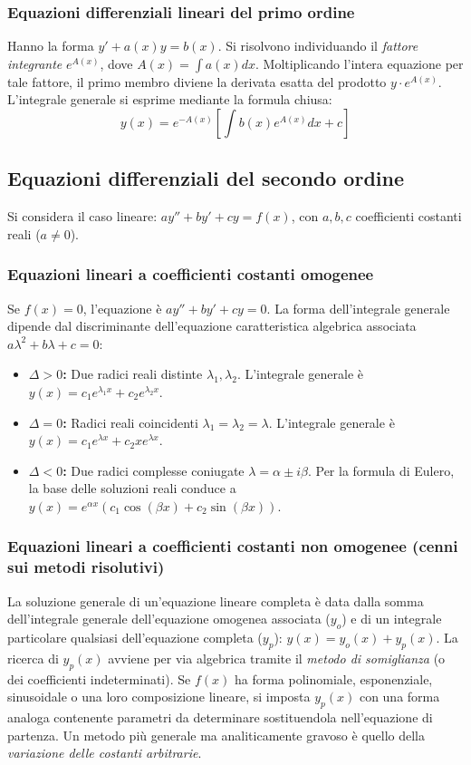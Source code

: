 \subsubsection{Equazioni differenziali lineari del primo ordine}
Hanno la forma $y' + a(x)y = b(x)$. Si risolvono individuando il \textit{fattore integrante} $e^{A(x)}$, dove $A(x) = \int a(x) dx$. Moltiplicando l'intera equazione per tale fattore, il primo membro diviene la derivata esatta del prodotto $y \cdot e^{A(x)}$. L'integrale generale si esprime mediante la formula chiusa:
\[ y(x) = e^{-A(x)} \left[ \int b(x) e^{A(x)} dx + c \right] \]

\subsection{Equazioni differenziali del secondo ordine}
Si considera il caso lineare: $ay'' + by' + cy = f(x)$, con $a, b, c$ coefficienti costanti reali ($a \neq 0$).

\subsubsection{Equazioni lineari a coefficienti costanti omogenee}
Se $f(x) = 0$, l'equazione è $ay'' + by' + cy = 0$. La forma dell'integrale generale dipende dal discriminante dell'equazione caratteristica algebrica associata $a\lambda^2 + b\lambda + c = 0$:
\begin{itemize}
    \item \textbf{$\Delta > 0$:} Due radici reali distinte $\lambda_1, \lambda_2$. L'integrale generale è $y(x) = c_1 e^{\lambda_1 x} + c_2 e^{\lambda_2 x}$.
    \item \textbf{$\Delta = 0$:} Radici reali coincidenti $\lambda_1 = \lambda_2 = \lambda$. L'integrale generale è $y(x) = c_1 e^{\lambda x} + c_2 x e^{\lambda x}$.
    \item \textbf{$\Delta < 0$:} Due radici complesse coniugate $\lambda = \alpha \pm i\beta$. Per la formula di Eulero, la base delle soluzioni reali conduce a $y(x) = e^{\alpha x} (c_1 \cos(\beta x) + c_2 \sin(\beta x))$.
\end{itemize}

\subsubsection{Equazioni lineari a coefficienti costanti non omogenee (cenni sui metodi risolutivi)}
La soluzione generale di un'equazione lineare completa è data dalla somma dell'integrale generale dell'equazione omogenea associata ($y_o$) e di un integrale particolare qualsiasi dell'equazione completa ($y_p$): $y(x) = y_o(x) + y_p(x)$.
La ricerca di $y_p(x)$ avviene per via algebrica tramite il \textit{metodo di somiglianza} (o dei coefficienti indeterminati). Se $f(x)$ ha forma polinomiale, esponenziale, sinusoidale o una loro composizione lineare, si imposta $y_p(x)$ con una forma analoga contenente parametri da determinare sostituendola nell'equazione di partenza. Un metodo più generale ma analiticamente gravoso è quello della \textit{variazione delle costanti arbitrarie}.

